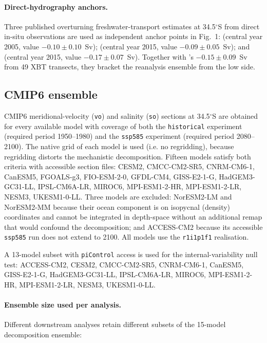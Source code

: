 \documentclass[11pt,a4paper]{article}
\begin{document}
\paragraph{Direct-hydrography anchors.} Three published overturning freshwater-transport estimates at 34.5$^\circ$S from direct in-situ observations are used as independent anchor points in Fig.~1: \citet{GarzoliMatano2011} (central year 2005, value $-0.10\pm0.10$~Sv); \citet{Meinen2018} (central year 2015, value $-0.09\pm0.05$~Sv); and \citet{Kersale2020} (central year 2015, value $-0.17\pm0.07$~Sv). Together with \citet{ArumiPlanas2024}'s $-0.15\pm0.09$~Sv from 49 XBT transects, they bracket the reanalysis ensemble from the low side.

\subsection*{CMIP6 ensemble}

CMIP6 meridional-velocity (\texttt{vo}) and salinity (\texttt{so}) sections at 34.5$^\circ$S are obtained for every available model with coverage of both the \texttt{historical} experiment (required period 1950--1980) and the \texttt{ssp585} experiment (required period 2080--2100). The native grid of each model is used (i.e. no regridding), because regridding distorts the mechanistic decomposition. Fifteen models satisfy both criteria with accessible section files: CESM2, CMCC-CM2-SR5, CNRM-CM6-1, CanESM5, FGOALS-g3, FIO-ESM-2-0, GFDL-CM4, GISS-E2-1-G, HadGEM3-GC31-LL, IPSL-CM6A-LR, MIROC6, MPI-ESM1-2-HR, MPI-ESM1-2-LR, NESM3, UKESM1-0-LL. Three models are excluded: NorESM2-LM and NorESM2-MM because their ocean component is on isopycnal (density) coordinates and cannot be integrated in depth-space without an additional remap that would confound the decomposition; and ACCESS-CM2 because its accessible \texttt{ssp585} run does not extend to 2100. All models use the \texttt{r1i1p1f1} realisation.

A 13-model subset with \texttt{piControl} access is used for the internal-variability null test: ACCESS-CM2, CESM2, CMCC-CM2-SR5, CNRM-CM6-1, CanESM5, GISS-E2-1-G, HadGEM3-GC31-LL, IPSL-CM6A-LR, MIROC6, MPI-ESM1-2-HR, MPI-ESM1-2-LR, NESM3, UKESM1-0-LL.

\paragraph{Ensemble size used per analysis.} Different downstream analyses retain different subsets of the 15-model decomposition ensemble:
\end{document}
